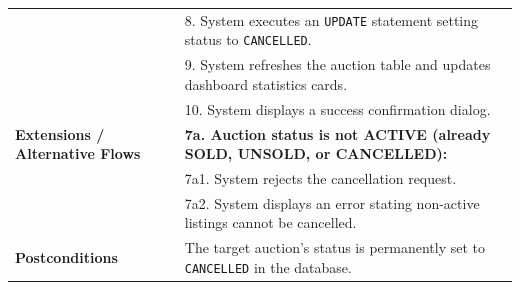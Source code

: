 \begin{table}[H]
\begin{tabularx}{\textwidth}{p{3.5cm}X}
                               & 8. System executes an \texttt{UPDATE} statement setting status to \texttt{CANCELLED}.\\
                               & 9. System refreshes the auction table and updates dashboard statistics cards.\\
                               & 10. System displays a success confirmation dialog. \\
\textbf{Extensions / Alternative Flows} & \textbf{7a. Auction status is not ACTIVE (already SOLD, UNSOLD, or CANCELLED):}\\
                                        & \quad 7a1. System rejects the cancellation request.\\
                                        & \quad 7a2. System displays an error stating non-active listings cannot be cancelled.\\
\textbf{Postconditions} & The target auction's status is permanently set to \texttt{CANCELLED} in the database. \\
\bottomrule
\end{tabularx}
\end{table}
